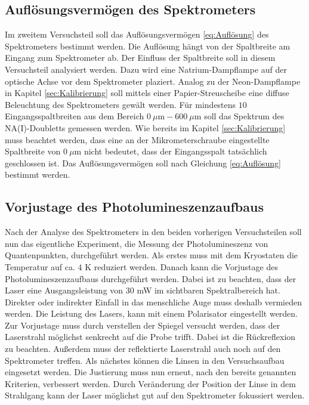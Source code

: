 \subsection{Auflösungsvermögen des Spektrometers}
Im zweitem Versuchsteil soll das Auflösungsvermögen \eqref{eq:Auflösung} des Spektrometers bestimmt werden. 
Die Auflösung hängt von der Spaltbreite am Eingang zum Spektrometer ab. Der Einfluss der Spaltbreite soll in diesem Versuchsteil analysiert werden. 
Dazu wird eine Natrium-Dampflampe auf der optische Achse vor dem Spektrometer plaziert. 
Analog zu der Neon-Dampflampe in Kapitel \ref{sec:Kalibrierung} soll mittels einer Papier-Streuscheibe eine diffuse Beleuchtung des Spektrometers gewält werden. 
Für mindestens $10$ Eingangsspaltbreiten aus dem Bereich $0\ \mu\mathrm{m} - 600\ \mu\mathrm{m}$ soll das Spektrum des NA(I)-Doubletts gemessen werden. 
Wie bereits im Kapitel \ref{sec:Kalibrierung} muss beachtet werden, dass eine an der Mikrometerschraube eingestellte Spaltbreite von $0\ \mu$m nicht bedeutet, dass der Eingangsspalt tatsächlich geschlossen ist.
Das Auflösungsvermögen soll nach Gleichung \eqref{eq:Auflösung} bestimmt werden.

\subsection{Vorjustage des Photolumineszenzaufbaus}
\label{sec:Justage}
Nach der Analyse des Spektrometers in den beiden vorherigen Versuchsteilen soll nun das eigentliche Experiment, die Messung der Photolumineszenz von Quantenpunkten, durchgeführt werden. 
Als erstes muss mit dem Kryostaten die Temperatur auf ca. $4$ K reduziert werden. 
Danach kann die Vorjustage des Photolumineszenzaufbaus durchgeführt werden. 
Dabei ist zu beachten, dass der Laser eine Ausgangsleistung von $30$ mW im sichtbaren Spektralbereich hat. 
Direkter oder indirekter Einfall in das menschliche Auge muss deshalb vermieden werden. 
Die Leistung des Lasers, kann mit einem Polarisator eingestellt werden. 
Zur Vorjustage muss durch verstellen der Spiegel versucht werden, dass der Laserstrahl möglichst senkrecht auf die Probe trifft. 
Dabei ist die Rückreflexion zu beachten.
Au{\ss}erdem muss der reflektierte Laserstrahl auch noch auf den Spektrometer treffen. 
Als nächstes können die Linsen in den Versuchsaufbau eingesetzt werden. 
Die Justierung muss nun erneut, nach den bereits genannten Kriterien, verbessert werden. 
Durch Veränderung der Position der Linse in dem Strahlgang kann der Laser möglichst gut auf den Spektrometer fokussiert werden. 
